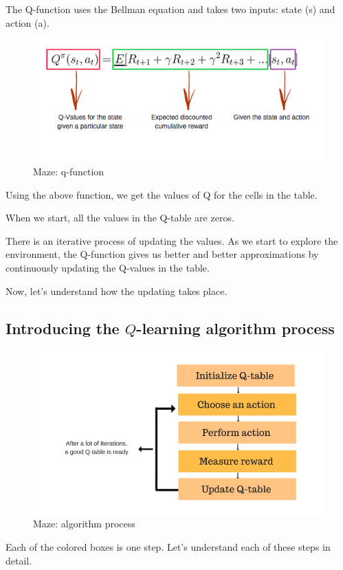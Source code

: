 The Q-function uses the Bellman equation and takes two inputs: state (s) and action (a).

\begin{figure}[h]
\centering
\includegraphics[scale=0.618]{pix/q_learning/q_function.png}
\caption{Maze: q-function}
\end{figure}

Using the above function, we get the values of Q for the cells in the table.

When we start, all the values in the Q-table are zeros.

There is an iterative process of updating the values. As we start to explore the 
environment, the Q-function gives us better and better approximations by continuously 
updating the Q-values in the table.

Now, let's understand how the updating takes place.


\subsection{Introducing the $Q$-learning algorithm process}

\begin{figure}[h]
\centering
\includegraphics[scale=0.4]{pix/q_learning/q_learning_algorithm_process.png}
\caption{Maze: algorithm process}
\end{figure}
Each of the colored boxes is one step. Let's understand each of these steps in detail.


